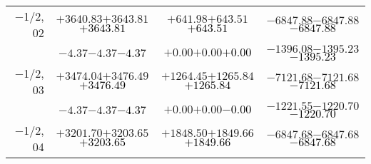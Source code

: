 \documentclass[compress]{beamer}
\begin{document}
\begin{frame}
{\begin{tabular}{r | c | c | c}
$-$1/2, 02 & $+3640.83$\hspace{0.1 cm}$+3643.81$\hspace{0.1 cm}\textcolor{black}{$+3643.81$} & $+641.98$\hspace{0.1 cm}$+643.51$\hspace{0.1 cm}\textcolor{black}{$+643.51$} & $-6847.88$\hspace{0.1 cm}$-6847.88$\hspace{0.1 cm}\textcolor{black}{$-6847.88$} \\
           & $-4.37$\hspace{0.1 cm}$-4.37$\hspace{0.1 cm}\textcolor{black}{$-4.37$} & $+0.00$\hspace{0.1 cm}$+0.00$\hspace{0.1 cm}\textcolor{black}{$+0.00$} & $-1396.08$\hspace{0.1 cm}$-1395.23$\hspace{0.1 cm}\textcolor{black}{$-1395.23$} \\
$-$1/2, 03 & $+3474.04$\hspace{0.1 cm}$+3476.49$\hspace{0.1 cm}\textcolor{black}{$+3476.49$} & $+1264.45$\hspace{0.1 cm}$+1265.84$\hspace{0.1 cm}\textcolor{black}{$+1265.84$} & $-7121.68$\hspace{0.1 cm}$-7121.68$\hspace{0.1 cm}\textcolor{black}{$-7121.68$} \\
           & $-4.37$\hspace{0.1 cm}$-4.37$\hspace{0.1 cm}\textcolor{black}{$-4.37$} & $+0.00$\hspace{0.1 cm}$+0.00$\hspace{0.1 cm}\textcolor{black}{$-0.00$} & $-1221.55$\hspace{0.1 cm}$-1220.70$\hspace{0.1 cm}\textcolor{black}{$-1220.70$} \\
$-$1/2, 04 & $+3201.70$\hspace{0.1 cm}$+3203.65$\hspace{0.1 cm}\textcolor{black}{$+3203.65$} & $+1848.50$\hspace{0.1 cm}$+1849.66$\hspace{0.1 cm}\textcolor{black}{$+1849.66$} & $-6847.68$\hspace{0.1 cm}$-6847.68$\hspace{0.1 cm}\textcolor{black}{$-6847.68$} \\

\end{tabular}}
\end{frame}
\end{document}
